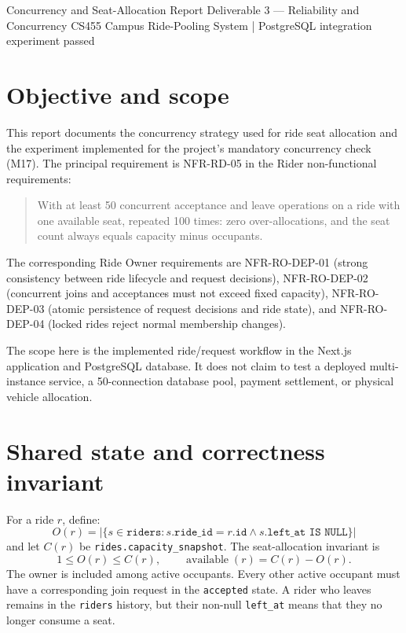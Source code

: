\documentclass[11pt,a4paper]{article}
\begin{document}
\makereporttitle
  {Concurrency and Seat-Allocation Report}
  {Deliverable 3 --- Reliability and Concurrency}
  {CS455 Campus Ride-Pooling System \quad | \quad PostgreSQL integration experiment passed}

\section{Objective and scope}

This report documents the concurrency strategy used for ride seat allocation and the experiment
implemented for the project's mandatory concurrency check (M17). The principal requirement is
NFR-RD-05 in the Rider non-functional requirements:

\begin{quote}
With at least 50 concurrent acceptance and leave operations on a ride with one available seat,
repeated 100 times: zero over-allocations, and the seat count always equals capacity minus
occupants.
\end{quote}

The corresponding Ride Owner requirements are NFR-RO-DEP-01 (strong consistency between ride
lifecycle and request decisions), NFR-RO-DEP-02 (concurrent joins and acceptances must not exceed
fixed capacity), NFR-RO-DEP-03 (atomic persistence of request decisions and ride state), and
NFR-RO-DEP-04 (locked rides reject normal membership changes).

The scope here is the implemented ride/request workflow in the Next.js application and PostgreSQL
database. It does not claim to test a deployed multi-instance service, a 50-connection database
pool, payment settlement, or physical vehicle allocation.

\section{Shared state and correctness invariant}

For a ride $r$, define:
\[
  O(r) = \left|\{s \in \texttt{riders} :
    s.\texttt{ride\_id}=r.\texttt{id} \land s.\texttt{left\_at IS NULL}\}\right|
\]
and let $C(r)$ be \texttt{rides.capacity\_snapshot}. The seat-allocation invariant is
\[
  1 \le O(r) \le C(r), \qquad
  \operatorname{available}(r)=C(r)-O(r).
\]
The owner is included among active occupants. Every other active occupant must have a corresponding
join request in the \texttt{accepted} state. A rider who leaves remains in the \texttt{riders}
history, but their non-null \texttt{left\_at} means that they no longer consume a seat.
\end{document}

